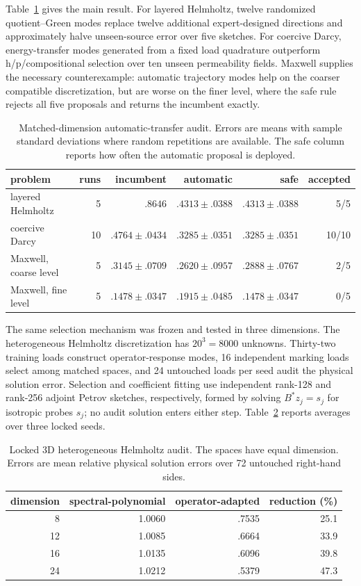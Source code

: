 \documentclass[11pt]{article}
\numberwithin{algorithm}{section}
\theoremstyle{definition}\newtheorem{definition}[theorem]{Definition}
\theoremstyle{remark}\newtheorem{remark}[theorem]{Remark}
\begin{document}
Table~\ref{tab:auto-transfer-crossclass} gives the main result.  For layered
Helmholtz, twelve randomized quotient--Green modes replace twelve additional
expert-designed directions and approximately halve unseen-source error over
five sketches.  For coercive Darcy, energy-transfer modes generated from a
fixed load quadrature outperform h/p/compositional selection over ten unseen
permeability fields.  Maxwell supplies the necessary counterexample: automatic
trajectory modes help on the coarser compatible discretization, but are worse
on the finer level, where the safe rule rejects all five proposals and returns
the incumbent exactly.

\begin{table}[H]
\centering
\caption{Matched-dimension automatic-transfer audit.  Errors are means with
sample standard deviations where random repetitions are available.  The safe
column reports how often the automatic proposal is deployed.}
\label{tab:auto-transfer-crossclass}
\begin{tabular}{lrrrrr}
\toprule
problem & runs & incumbent & automatic & safe & accepted\\
\midrule
layered Helmholtz & 5 & $.8646$ & $.4313\pm.0388$ & $.4313\pm.0388$ & 5/5\\
coercive Darcy & 10 & $.4764\pm.0434$ & $.3285\pm.0351$ & $.3285\pm.0351$ & 10/10\\
Maxwell, coarse level & 5 & $.3145\pm.0709$ & $.2620\pm.0957$ & $.2888\pm.0767$ & 2/5\\
Maxwell, fine level & 5 & $.1478\pm.0347$ & $.1915\pm.0485$ & $.1478\pm.0347$ & 0/5\\
\bottomrule
\end{tabular}
\end{table}

The same selection mechanism was frozen and tested in three dimensions.  The
heterogeneous Helmholtz discretization has $20^3=8000$ unknowns.  Thirty-two
training loads construct operator-response modes, 16 independent marking
loads select among matched spaces, and 24 untouched loads per seed audit the
physical solution error.  Selection and coefficient fitting use independent
rank-128 and rank-256 adjoint Petrov sketches, respectively, formed by solving
$B^*z_j=s_j$ for isotropic probes $s_j$; no audit solution enters either step.
Table~\ref{tab:helmholtz-3d-adjoint} reports averages over three locked seeds.

\begin{table}[H]
\centering
\caption{Locked 3D heterogeneous Helmholtz audit.  The spaces
have equal dimension.  Errors are mean relative physical solution errors over
72 untouched right-hand sides.}
\label{tab:helmholtz-3d-adjoint}
\begin{tabular}{rrrr}
\toprule
dimension & spectral-polynomial & operator-adapted & reduction (\%)\\
\midrule
8  & 1.0060 & .7535 & 25.1\\
12 & 1.0085 & .6664 & 33.9\\
16 & 1.0135 & .6096 & 39.8\\
24 & 1.0212 & .5379 & 47.3\\
\bottomrule
\end{tabular}
\end{table}
\end{document}
